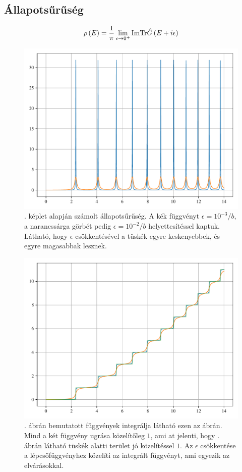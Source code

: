 \subsection{Állapotsűrűség}
\begin{equation}
	\rho\left(E\right) = \frac{1}{\pi}\lim_{\epsilon \to 0^+} \mathrm{Im}\mathrm{Tr}\hat{G}\left(E + i\epsilon\right)
	\label{green:densityeq}
\end{equation}
\begin{figure}[H]
	\includegraphics[scale=1]{./figs/dosfromgreen.pdf}
	\caption[Állapotsűrűség]{. képlet alapján számolt állapotsűrűség. A kék függvényt $\epsilon = 10^{-3}/b$, a narancssárga görbét pedig $\epsilon = 10^{-2}/b$ helyettesítéssel kaptuk. Látható, hogy $\epsilon$ csökkentésével a tüskék egyre keskenyebbek, és egyre magasabbak lesznek.}
	\label{green:állapotsűrség}
\end{figure}
\begin{figure}[H]
	\includegraphics[scale=1]{./figs/numberofstatesfromgreen.pdf}
	\caption[Állapotok száma]{. ábrán bemutatott függvények integrálja látható ezen az ábrán. Mind a két függvény ugrása közelítőleg $1$, ami at jelenti, hogy . ábrán látható tüskék alatti terület jó közelítéssel $1$. Az $\epsilon$ csökkentése a lépcsőfüggvényhez közelíti az integrált függvényt, ami egyezik az elvárásokkal.}
\end{figure}
